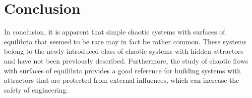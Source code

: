 \section{Conclusion}

In conclusion, it is apparent that simple chaotic systems
with surfaces of equilibria that seemed to be rare may
in fact be rather common. These systems belong to the
newly introduced class of chaotic systems with hidden
attractors and have not been previously described. Furthermore,
the study of chaotic flows with surfaces of
equilibria provides a good reference for building systems
with attractors that are protected from external
influences, which can increase the safety of engineering.



